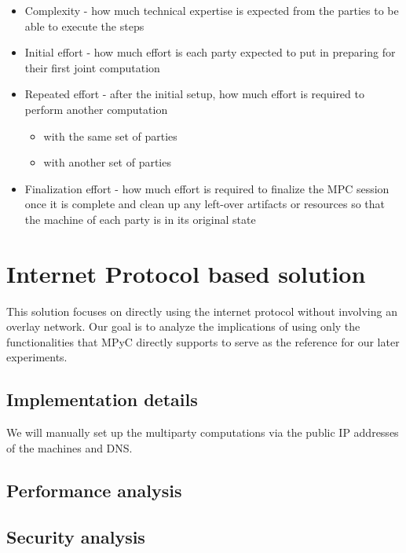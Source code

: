 \begin{itemize}
\tightlist
\item
  Complexity - how much technical expertise is expected from the parties
  to be able to execute the steps
\item
  Initial effort - how much effort is each party expected to put in
  preparing for their first joint computation
\item
  Repeated effort - after the initial setup, how much effort is required
  to perform another computation

  \begin{itemize}
  \tightlist
  \item
    with the same set of parties
  \item
    with another set of parties
  \end{itemize}
\item
  Finalization effort - how much effort is required to finalize the MPC
  session once it is complete and clean up any left-over artifacts or
  resources so that the machine of each party is in its original state
\end{itemize}

\hypertarget{internet-protocol-based-solution}{%
\chapter{Internet Protocol based
solution}\label{internet-protocol-based-solution}}

This solution focuses on directly using the internet protocol without
involving an overlay network. Our goal is to analyze the implications of
using only the functionalities that MPyC directly supports to serve as
the reference for our later experiments.

\hypertarget{implementation-details}{%
\section{Implementation details}\label{implementation-details}}

We will manually set up the multiparty computations via the public IP
addresses of the machines and DNS.

\hypertarget{performance-analysis}{%
\section{Performance analysis}\label{performance-analysis}}

\hypertarget{security-analysis}{%
\section{Security analysis}\label{security-analysis}}

